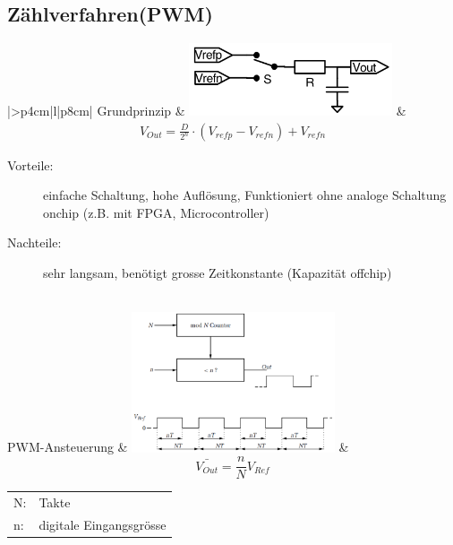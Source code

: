 \subsection{Zählverfahren(PWM)}
\begin{tabular}{|>{\bfseries}p{4cm}|l|p{8cm}|}
	\hline 
	Grundprinzip \hartl{466}
	& \includegraphics[width=6cm, valign=t]{./pictures/pwm_DAC.png}
	& {\begin{gather*}
		V_{Out}=\frac{D}{2^n} \cdot (V_{refp}-V_{refn})+V_{refn}
	  \end{gather*}}
	  \begin{description}
  		\item[Vorteile:] einfache Schaltung, hohe Auflösung, Funktioniert ohne analoge Schaltung onchip (z.B. mit FPGA, Microcontroller) 
  		\item[Nachteile:] sehr langsam, benötigt grosse Zeitkonstante (Kapazität offchip)
	  \end{description}
	\\ \hline
	PWM-Ansteuerung \hartl{466}
	& \includegraphics[width=6cm, valign=t]{./pictures/pwm_Ansteuerung.png}
	& {\begin{equation*}
		\bar{V_{Out}}=\frac{n}{N}V_{Ref}
	  \end{equation*}}
	  \begin{tabular}{ll}
		N:&Takte\\
		n:&digitale Eingangsgrösse
	  \end{tabular}
	\\ \hline
\end{tabular}

